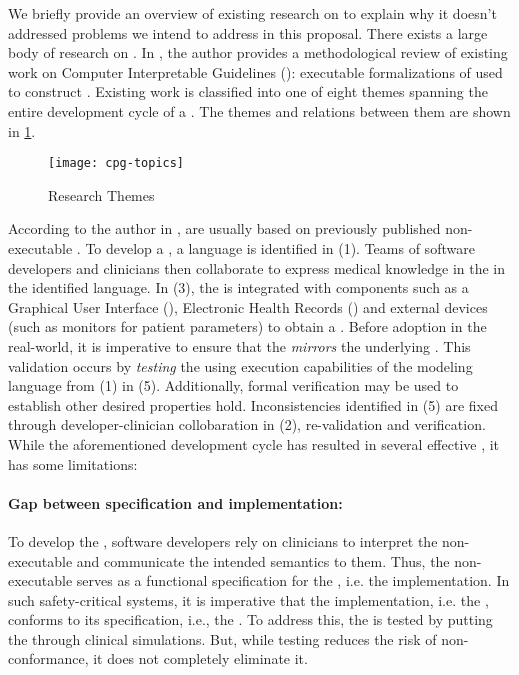 We briefly provide an overview of existing research on \CDSSs{} to explain why
it doesn't addressed problems we intend to address in this proposal.
There exists a large body of research on \CDSSs{}. In
\cite{PelegJBI13}, the author provides a methodological review of
existing work on Computer Interpretable Guidelines (\CIGs{}): executable
formalizations of \BPGs{} used to construct \CDSSs{}.
Existing work is classified into one of eight themes spanning
the entire development cycle of a \CIG{}. The themes and relations between them
are shown in \figurename{} \ref{fig:cpg-research-topics}.
\begin{figure}[h]
  \centering
  \texttt{[image: cpg-topics]}
  \caption{\CDSSs{} Research Themes}\label{fig:cpg-research-topics}
\end{figure}

According to the author in \cite{PelegJBI13}, \CIGs{} are usually based on previously published non-executable
\BPGs{}. To develop a \CIG{}, a language is identified in (1). Teams of
software developers and clinicians then collaborate to express medical knowledge
in the \BPG{} in the identified language. In (3), the \CIG{}
is integrated with components such as a Graphical User
Interface (\GUI{}), Electronic Health Records (\EHRs{}) and external devices
(such as monitors for patient parameters) to obtain a \CDSS. Before adoption
in the real-world, it is imperative to ensure that the \CIG{} \emph{mirrors}
the underlying \BPG{}. This validation occurs by \emph{testing} the \CDSS{}
using execution capabilities of the modeling language from (1) in (5).
Additionally, formal verification may be used to establish other desired
properties hold. Inconsistencies identified in (5) are fixed through developer-clinician
collobaration in (2),  re-validation and
verification. While the aforementioned development cycle has resulted in several
effective \CDSSs{}, it has some limitations:

\paragraph{Gap between specification and implementation:}

To develop the \CIG{}, software developers rely on clinicians to interpret the
non-executable \BPG{} and communicate
the intended semantics to them. Thus, the non-executable \BPG{} serves as a functional specification for
the \CIG{}, i.e. the implementation. In such safety-critical systems, it is
imperative that the implementation, i.e. the \CIG{}, conforms to its
specification, i.e., the \BPG{}. To address this, the \CIG{} is tested by
putting the \CDSS{} through clinical simulations. But, while testing reduces
the risk of non-conformance, it does not completely eliminate it.

